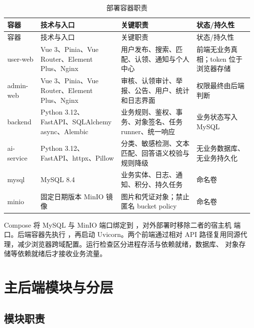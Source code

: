 \begin{longtable}{L{2.5cm} L{3.5cm} L{4.9cm} L{3.5cm}}
  \caption{部署容器职责}\label{tab:containers}\\
  \toprule
  容器 & 技术与入口 & 关键职责 & 状态/持久性 \\
  \midrule
  \endfirsthead
  \toprule
  容器 & 技术与入口 & 关键职责 & 状态/持久性 \\
  \midrule
  \endhead
  user-web & Vue 3、Pinia、Vue Router、Element Plus、Nginx & 用户发布、搜索、匹配、认领、通知与个人中心 & 前端无业务真相；token 位于浏览器存储 \\
  admin-web & Vue 3、Pinia、Vue Router、Element Plus、Nginx & 审核、认领审计、举报、公告、用户、统计和日志界面 & 权限最终由后端判断 \\
  backend & Python 3.12、FastAPI、SQLAlchemy async、Alembic & 业务规则、鉴权、事务、对象签名、任务 runner、统一响应 & 业务状态写入 MySQL \\
  ai-service & Python 3.12、FastAPI、httpx、Pillow & 分类、敏感检测、文本匹配、回答语义校验与规则降级 & 无业务数据库、无业务持久化 \\
  mysql & MySQL 8.4 & 业务实体、日志、通知、积分、持久任务 & 命名卷  \\
  minio & 固定日期版本 MinIO 镜像 & 图片和凭证对象；禁止匿名 bucket policy & 命名卷  \\
  \bottomrule
\end{longtable}

Compose 将 MySQL 与 MinIO 端口绑定到 ，对外部署时移除二者的宿主机
端口。后端容器先执行 ，再启动 Uvicorn。两个前端通过相对
API 路径复用同源代理，减少浏览器跨域配置。运行检查区分进程存活与依赖就绪，数据库、
对象存储等依赖就绪后才接收业务流量。

\section{主后端模块与分层}

\subsection{模块职责}

